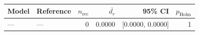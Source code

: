 \begin{tabular}{llrrrr}
\toprule
Model & Reference & $n_{\text{rec}}$ & $\overline{d_r}$ & 95\% CI & $p_{\text{Holm}}$ \\
\midrule
--- & --- & 0 & 0.0000 & [0.0000, 0.0000] & 1 \\
\bottomrule
\end{tabular}
